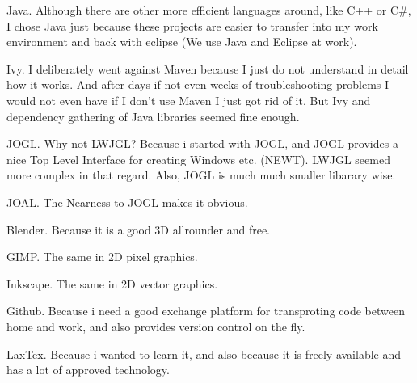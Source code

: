 \documentclass[../index.tex]{subfiles}
\begin{document}
\begin{worddefs}

\item[Java.]Although there are other more efficient languages around, like C++ or C\#, I chose Java just because these projects are easier to transfer into my work environment and back with eclipse (We use Java and Eclipse at work).

\item[Ivy.] I deliberately went against Maven because I just do not understand in detail how it works. And after days if not even weeks of troubleshooting problems I would not even have if I don't use Maven I just got rid of it. But Ivy and dependency gathering of Java libraries seemed fine enough.

\item[JOGL.] Why not LWJGL? Because i started with JOGL, and JOGL provides a nice Top Level Interface for creating Windows etc. (NEWT). LWJGL seemed more complex in that regard. Also, JOGL is much much smaller libarary wise.

\item[JOAL.] The Nearness to JOGL makes it obvious.

\item[Blender.] Because it is a good 3D allrounder and free.

\item[GIMP.] The same in 2D pixel graphics.

\item[Inkscape.] The same in 2D vector graphics.

\item[Github.] Because i need a good exchange platform for transproting code between home and work, and also provides version control on the fly.

\item[LaxTex.] Because i wanted to learn it, and also because it is freely available and has a lot of approved technology.

\end{worddefs}
\end{document}
